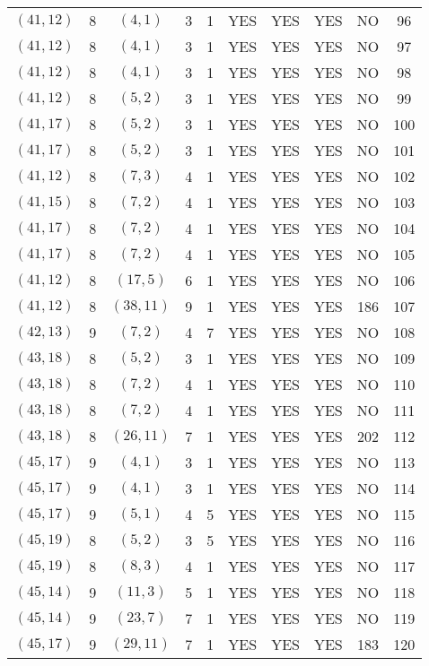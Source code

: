 \begin{longtable}{|c|c|c|c|c|c|c|c|c|c|}
$(41, 12)$ & 8 & $(4, 1)$ & 3 & 1 & YES & YES & YES & NO & 96\\
$(41, 12)$ & 8 & $(4, 1)$ & 3 & 1 & YES & YES & YES & NO & 97\\
$(41, 12)$ & 8 & $(4, 1)$ & 3 & 1 & YES & YES & YES & NO & 98\\
$(41, 12)$ & 8 & $(5, 2)$ & 3 & 1 & YES & YES & YES & NO & 99\\
$(41, 17)$ & 8 & $(5, 2)$ & 3 & 1 & YES & YES & YES & NO & 100\\
$(41, 17)$ & 8 & $(5, 2)$ & 3 & 1 & YES & YES & YES & NO & 101\\
$(41, 12)$ & 8 & $(7, 3)$ & 4 & 1 & YES & YES & YES & NO & 102\\
$(41, 15)$ & 8 & $(7, 2)$ & 4 & 1 & YES & YES & YES & NO & 103\\
$(41, 17)$ & 8 & $(7, 2)$ & 4 & 1 & YES & YES & YES & NO & 104\\
$(41, 17)$ & 8 & $(7, 2)$ & 4 & 1 & YES & YES & YES & NO & 105\\
$(41, 12)$ & 8 & $(17, 5)$ & 6 & 1 & YES & YES & YES & NO & 106\\
$(41, 12)$ & 8 & $(38, 11)$ & 9 & 1 & YES & YES & YES & 186 & 107\\
$(42, 13)$ & 9 & $(7, 2)$ & 4 & 7 & YES & YES & YES & NO & 108\\
$(43, 18)$ & 8 & $(5, 2)$ & 3 & 1 & YES & YES & YES & NO & 109\\
$(43, 18)$ & 8 & $(7, 2)$ & 4 & 1 & YES & YES & YES & NO & 110\\
$(43, 18)$ & 8 & $(7, 2)$ & 4 & 1 & YES & YES & YES & NO & 111\\
$(43, 18)$ & 8 & $(26, 11)$ & 7 & 1 & YES & YES & YES & 202 & 112\\
$(45, 17)$ & 9 & $(4, 1)$ & 3 & 1 & YES & YES & YES & NO & 113\\
$(45, 17)$ & 9 & $(4, 1)$ & 3 & 1 & YES & YES & YES & NO & 114\\
$(45, 17)$ & 9 & $(5, 1)$ & 4 & 5 & YES & YES & YES & NO & 115\\
$(45, 19)$ & 8 & $(5, 2)$ & 3 & 5 & YES & YES & YES & NO & 116\\
$(45, 19)$ & 8 & $(8, 3)$ & 4 & 1 & YES & YES & YES & NO & 117\\
$(45, 14)$ & 9 & $(11, 3)$ & 5 & 1 & YES & YES & YES & NO & 118\\
$(45, 14)$ & 9 & $(23, 7)$ & 7 & 1 & YES & YES & YES & NO & 119\\
$(45, 17)$ & 9 & $(29, 11)$ & 7 & 1 & YES & YES & YES & 183 & 120\\

\end{longtable}
